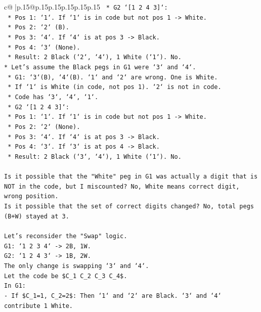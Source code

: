 \documentclass{article}
\begin{document}
{\begin{supertabular}{c@{$\;$}|p{.15\linewidth}@{}p{.15\linewidth}p{.15\linewidth}p{.15\linewidth}p{.15\linewidth}p{.15\linewidth}}
{{{\texttt{    *   G2 `{[}1 2 4 3{]}`:} \\
\texttt{        *   Pos 1: `1`. If `1` is in code but not pos 1 {-}> White.} \\
\texttt{        *   Pos 2: `2` (B).} \\
\texttt{        *   Pos 3: `4`. If `4` is at pos 3 {-}> Black.} \\
\texttt{        *   Pos 4: `3` (None).} \\
\texttt{        *   Result: 2 Black (`2`, `4`), 1 White (`1`). No.} \\
\texttt{*   Let's assume the Black pegs in G1 were `3` and `4`.} \\
\texttt{    *   G1: `3`(B), `4`(B). `1` and `2` are wrong. One is White.} \\
\texttt{    *   If `1` is White (in code, not pos 1). `2` is not in code.} \\
\texttt{    *   Code has `3`, `4`, `1`.} \\
\texttt{    *   G2 `{[}1 2 4 3{]}`:} \\
\texttt{        *   Pos 1: `1`. If `1` is in code but not pos 1 {-}> White.} \\
\texttt{        *   Pos 2: `2` (None).} \\
\texttt{        *   Pos 3: `4`. If `4` is at pos 3 {-}> Black.} \\
\texttt{        *   Pos 4: `3`. If `3` is at pos 4 {-}> Black.} \\
\texttt{        *   Result: 2 Black (`3`, `4`), 1 White (`1`). No.} \\
\\ 
\texttt{Is it possible that the "White" peg in G1 was actually a digit that is NOT in the code, but I miscounted? No, White means correct digit, wrong position.} \\
\texttt{Is it possible that the set of correct digits changed? No, total pegs (B+W) stayed at 3.} \\
\\ 
\texttt{Let's reconsider the "Swap" logic.} \\
\texttt{G1: `1 2 3 4` {-}> 2B, 1W.} \\
\texttt{G2: `1 2 4 3` {-}> 1B, 2W.} \\
\texttt{The only change is swapping `3` and `4`.} \\
\texttt{Let the code be \$C\_1 C\_2 C\_3 C\_4\$.} \\
\texttt{In G1:} \\
\texttt{{-} If \$C\_1=1, C\_2=2\$: Then `1` and `2` are Black. `3` and `4` contribute 1 White.} \\
}}}
\end{supertabular}}
\end{document}
